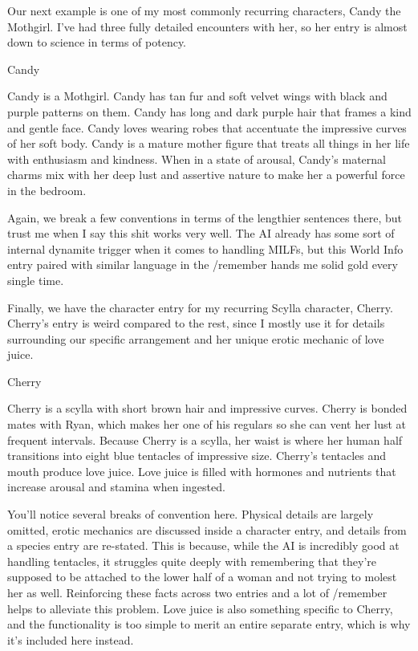 \documentclass[Source-main.tex]{subfiles}
\begin{document}
Our next example is one of my most commonly recurring characters, Candy the Mothgirl.
I’ve had three fully detailed encounters with her, so her entry is almost down to science in terms of potency.

\begin{WIbox}{Candy}

Candy is a Mothgirl.
Candy has tan fur and soft velvet wings with black and purple patterns on them.
Candy has long and dark purple hair that frames a kind and gentle face.
Candy loves wearing robes that accentuate the impressive curves of her soft body.
Candy is a mature mother figure that treats all things in her life with enthusiasm and kindness.
When in a state of arousal, Candy’s maternal charms mix with her deep lust and assertive nature to make her a powerful force in the bedroom.

\end{WIbox}

Again, we break a few conventions in terms of the lengthier sentences there, but trust me when I say this shit works very well.
The AI already has some sort of internal dynamite trigger when it comes to handling MILFs, but this World Info entry paired with similar language in the /remember hands me solid gold every single time.


Finally, we have the character entry for my recurring Scylla character, Cherry.
Cherry’s entry is weird compared to the rest, since I mostly use it for details surrounding our specific arrangement and her unique erotic mechanic of love juice.

\begin{WIbox}{Cherry}

Cherry is a scylla with short brown hair and impressive curves.
Cherry is bonded mates with Ryan, which makes her one of his regulars so she can vent her lust at frequent intervals.
Because Cherry is a scylla, her waist is where her human half transitions into eight blue tentacles of impressive size.
Cherry's tentacles and mouth produce love juice.
Love juice is filled with hormones and nutrients that increase arousal and stamina when ingested.

\end{WIbox}

You’ll notice several breaks of convention here.
Physical details are largely omitted, erotic mechanics are discussed inside a character entry, and details from a species entry are re-stated.
This is because, while the AI is incredibly good at handling tentacles, it struggles quite deeply with remembering that they’re supposed to be attached to the lower half of a woman and not trying to molest her as well.
Reinforcing these facts across two entries and a lot of /remember helps to alleviate this problem.
Love juice is also something specific to Cherry, and the functionality is too simple to merit an entire separate entry, which is why it’s included here instead.
\end{document}
